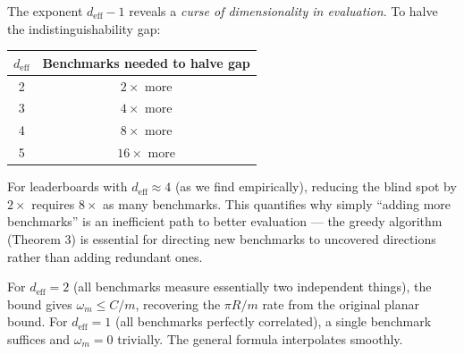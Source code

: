 \begin{remark}
The exponent $d_{\mathrm{eff}} - 1$ reveals a \emph{curse of dimensionality in evaluation}. To halve the indistinguishability gap:
\begin{center}
\begin{tabular}{cc}
\toprule
$d_{\mathrm{eff}}$ & Benchmarks needed to halve gap \\
\midrule
2 & $2\times$ more \\
3 & $4\times$ more \\
4 & $8\times$ more \\
5 & $16\times$ more \\
\bottomrule
\end{tabular}
\end{center}
For leaderboards with $d_{\mathrm{eff}} \approx 4$ (as we find empirically), reducing the blind spot by $2\times$ requires $8\times$ as many benchmarks. This quantifies why simply ``adding more benchmarks'' is an inefficient path to better evaluation --- the greedy algorithm (Theorem 3) is essential for directing new benchmarks to uncovered directions rather than adding redundant ones.
\end{remark}

\begin{remark}
For $d_{\mathrm{eff}} = 2$ (all benchmarks measure essentially two independent things), the bound gives $\omega_m \leq C/m$, recovering the $\pi R / m$ rate from the original planar bound. For $d_{\mathrm{eff}} = 1$ (all benchmarks perfectly correlated), a single benchmark suffices and $\omega_m = 0$ trivially. The general formula interpolates smoothly.
\end{remark}
